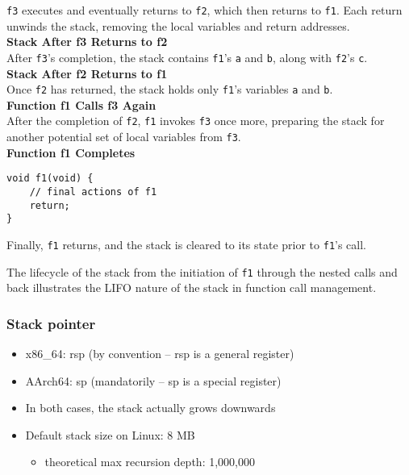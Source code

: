 \documentclass[12pt]{article}
\begin{document}
\texttt{f3} executes and eventually returns to \texttt{f2}, which then returns to \texttt{f1}. Each return unwinds the stack, removing the local variables and return addresses.\\

\textbf{Stack After f3 Returns to f2}\\
After \texttt{f3}'s completion, the stack contains \texttt{f1}'s \texttt{a} and \texttt{b}, along with \texttt{f2}'s \texttt{c}.\\

\textbf{Stack After f2 Returns to f1}\\
Once \texttt{f2} has returned, the stack holds only \texttt{f1}'s variables \texttt{a} and \texttt{b}.\\

\textbf{Function f1 Calls f3 Again}\\
After the completion of \texttt{f2}, \texttt{f1} invokes \texttt{f3} once more, preparing the stack for another potential set of local variables from \texttt{f3}.\\

\textbf{Function f1 Completes}
\begin{verbatim}
void f1(void) {
    // final actions of f1
    return;
}
\end{verbatim}
Finally, \texttt{f1} returns, and the stack is cleared to its state prior to \texttt{f1}'s call.

The lifecycle of the stack from the initiation of \texttt{f1} through the nested calls and back illustrates the LIFO nature of the stack in function call management.


\subsubsection{Stack pointer}
\begin{itemize}
    \item x86\_64: rsp (by convention -- rsp is a general register)
    \item AArch64: sp (mandatorily -- sp is a special register)
    \item In both cases, the stack actually grows downwards
    \item Default stack size on Linux: 8 MB
    \begin{itemize}
        \item theoretical max recursion depth: 1,000,000
    \end{itemize}
\end{itemize}
\end{document}
